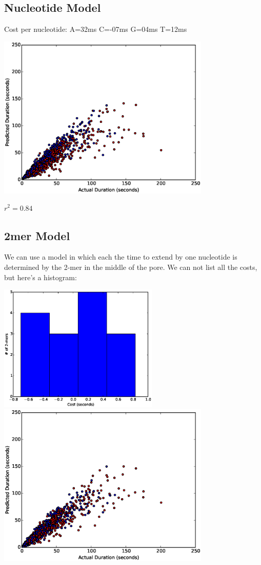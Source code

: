 \subsection*{Nucleotide Model}
Cost per nucleotide: 
A=32ms 
C=-07ms 
G=04ms 
T=12ms 


\includegraphics[width=4in]{part11scatter1mer}

$r^2=0.84$

\subsection*{2mer Model}

        We can use a model in which each the time to extend by one nucleotide is determined by the 2-mer in the middle of the
        pore.  We can not list all the costs, but here's a histogram:
        
\includegraphics[width=3in]{part11hist2}\\
\includegraphics[width=4in]{part11scatter2mer}

